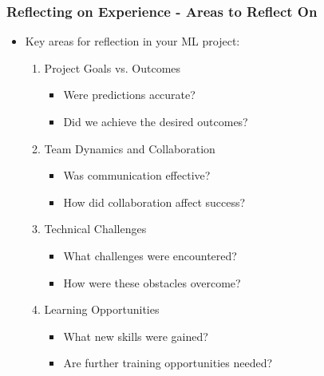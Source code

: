 \documentclass[aspectratio=169]{beamer}
\begin{document}
\begin{frame}[fragile]
    \frametitle{Reflecting on Experience - Areas to Reflect On}
    \begin{itemize}
        \item Key areas for reflection in your ML project:
        \begin{enumerate}
            \item Project Goals vs. Outcomes
            \begin{itemize}
                \item Were predictions accurate?
                \item Did we achieve the desired outcomes?
            \end{itemize}
            \item Team Dynamics and Collaboration
            \begin{itemize}
                \item Was communication effective?
                \item How did collaboration affect success?
            \end{itemize}
            \item Technical Challenges
            \begin{itemize}
                \item What challenges were encountered?
                \item How were these obstacles overcome?
            \end{itemize}
            \item Learning Opportunities
            \begin{itemize}
                \item What new skills were gained?
                \item Are further training opportunities needed?
            \end{itemize}
        \end{enumerate}
    \end{itemize}
\end{frame}
\end{document}
